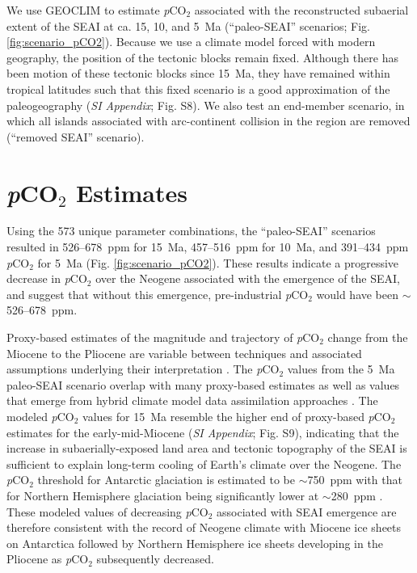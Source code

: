 \documentclass[9pt,twocolumn,twoside,lineno]{pnas-new}
\newcommand{\pCOtwo}{\textit{p}CO$_{2}$\xspace}
\newcommand{\SI}{\textit{SI Appendix}\xspace}
\begin{document}
We use GEOCLIM to estimate \pCOtwo associated with the reconstructed subaerial extent of the SEAI at ca. 15, 10, and 5~Ma (``paleo-SEAI'' scenarios; Fig. \ref{fig:scenario_pCO2}). Because we use a climate model forced with modern geography, the position of the tectonic blocks remain fixed. Although there has been motion of these tectonic blocks since 15~Ma, they have remained within tropical latitudes such that this fixed scenario is a good approximation of the paleogeography (\SI; Fig. S8). We also test an end-member scenario, in which all islands associated with arc-continent collision in the region are removed (``removed SEAI'' scenario).

\section*{\pCOtwo Estimates}

Using the 573 unique parameter combinations, the ``paleo-SEAI'' scenarios resulted in 526--678~ppm for 15~Ma, 457--516~ppm for 10~Ma, and 391--434~ppm \pCOtwo for 5~Ma (Fig. \ref{fig:scenario_pCO2}). These results indicate a progressive decrease in \pCOtwo over the Neogene associated with the emergence of the SEAI, and suggest that without this emergence, pre-industrial \pCOtwo would have been $\sim$526--678~ppm.

Proxy-based estimates of the magnitude and trajectory of \pCOtwo change from the Miocene to the Pliocene are variable between techniques and associated assumptions underlying their interpretation \cite{Foster2017a}. The \pCOtwo values from the 5~Ma paleo-SEAI scenario overlap with many proxy-based estimates as well as values that emerge from hybrid climate model data assimilation approaches \cite{Berends2020a}. The modeled \pCOtwo values for 15~Ma resemble the higher end of proxy-based \pCOtwo estimates for the early-mid-Miocene (\SI; Fig. S9), indicating that the increase in subaerially-exposed land area and tectonic topography of the SEAI is sufficient to explain long-term cooling of Earth's climate over the Neogene. The \pCOtwo threshold for Antarctic glaciation is estimated to be $\sim$750~ppm with that for Northern Hemisphere glaciation being significantly lower at $\sim$280~ppm \cite{DeConto2008a}. These modeled values of decreasing \pCOtwo associated with SEAI emergence are therefore consistent with the record of Neogene climate with Miocene ice sheets on Antarctica \cite{Sugden1995a} followed by Northern Hemisphere ice sheets developing in the Pliocene \cite{Haug2005a} as \pCOtwo subsequently decreased.
\end{document}
